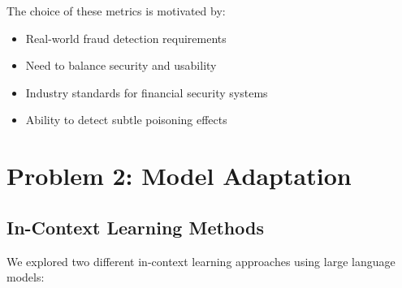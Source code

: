 \documentclass{article}
\begin{document}
The choice of these metrics is motivated by:
\begin{itemize}
    \item Real-world fraud detection requirements
    \item Need to balance security and usability
    \item Industry standards for financial security systems
    \item Ability to detect subtle poisoning effects
\end{itemize}

\section{Problem 2: Model Adaptation}

\subsection{In-Context Learning Methods}
We explored two different in-context learning approaches using large language models:
\end{document}
